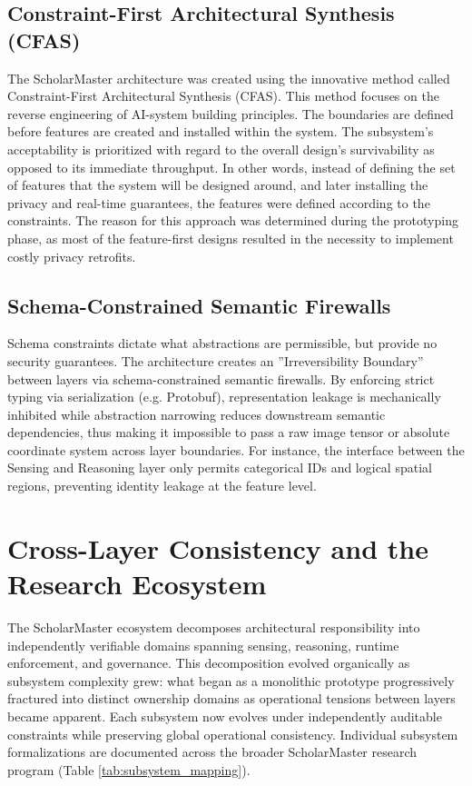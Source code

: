 \documentclass[conference]{IEEEtran}
\begin{document}
\subsection{Constraint-First Architectural Synthesis (CFAS)}
The ScholarMaster architecture was created using the innovative method called Constraint-First Architectural Synthesis (CFAS). This method focuses on the reverse engineering of AI-system building principles. The boundaries are defined before features are created and installed within the system. The subsystem’s acceptability is prioritized with regard to the overall design’s survivability as opposed to its immediate throughput. In other words, instead of defining the set of features that the system will be designed around, and later installing the privacy and real-time guarantees, the features were defined according to the constraints. The reason for this approach was determined during the prototyping phase, as most of the feature-first designs resulted in the necessity to implement costly privacy retrofits.

\subsection{Schema-Constrained Semantic Firewalls}
Schema constraints dictate what abstractions are permissible, but provide no security guarantees. The architecture creates an ''Irreversibility Boundary'' between layers via schema-constrained semantic firewalls. By enforcing strict typing via serialization (e.g. Protobuf), representation leakage is mechanically inhibited while abstraction narrowing reduces downstream semantic dependencies, thus making it impossible to pass a raw image tensor or absolute coordinate system across layer boundaries. For instance, the interface between the Sensing and Reasoning layer only permits categorical IDs and logical spatial regions, preventing identity leakage at the feature level.

\section{Cross-Layer Consistency and the Research Ecosystem}
The ScholarMaster ecosystem decomposes architectural responsibility into independently verifiable domains spanning sensing, reasoning, runtime enforcement, and governance. This decomposition evolved organically as subsystem complexity grew: what began as a monolithic prototype progressively fractured into distinct ownership domains as operational tensions between layers became apparent. Each subsystem now evolves under independently auditable constraints while preserving global operational consistency. Individual subsystem formalizations are documented across the broader ScholarMaster research program (Table \ref{tab:subsystem_mapping}).
\end{document}
